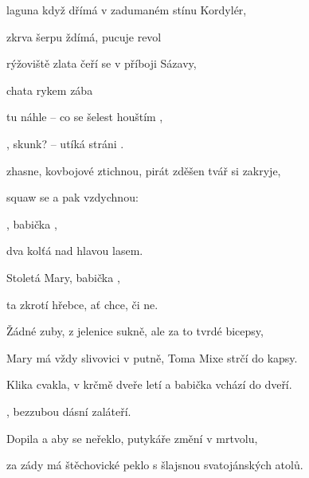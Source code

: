 

\zs
{} laguna když dřímá v zadumaném stínu Kordylér, 

 zkrva šerpu ždímá,  pucuje revol 

\bigskip

 rýžoviště zlata čeří se v příboji Sázavy, 

  chata  rykem  zába 

\bigskip

 tu náhle -- co se   šelest houštím 
, 

, skunk? --  utíká  stráni . 

\bigskip

 zhasne, kovbojové ztichnou, pirát zděšen tvář si zakryje, 

 squaw se  a pak vzdychnou:
 \ks

\zr
{}, babička , 

dva kolťá nad hlavou  lasem. 

Stoletá Mary, babička , 

ta zkrotí  hřebce, ať chce, či ne. 
\kr

\zs
Žádné zuby, z jelenice sukně, ale za to tvrdé bicepsy, 

Mary má vždy slivovici v putně, Toma Mixe strčí do kapsy. 

\bigskip

Klika cvakla, v krčmě dveře letí a babička vchází do dveří.

, bezzubou dásní zaláteří. 

\bigskip


\bigskip

Dopila a aby se neřeklo, putykáře změní v mrtvolu, 

za zády má štěchovické peklo s šlajsnou svatojánských atolů. 
\ks

